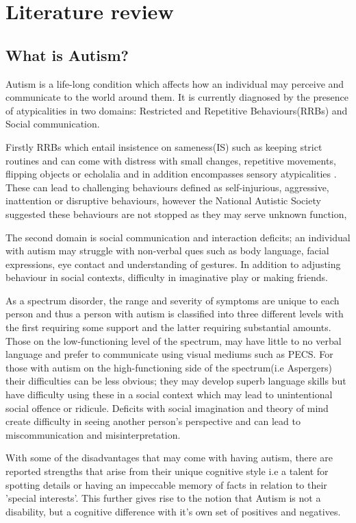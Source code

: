 \documentclass[11pt]{report}
\begin{document}
\chapter{Literature review}

\section{What is Autism?}

Autism is a life-long condition which affects how an individual may perceive and communicate to the world around them\cite{nas}. It is currently diagnosed by the presence of atypicalities in two domains: Restricted and Repetitive Behaviours(RRBs) and Social communication.

Firstly RRBs which entail insistence on sameness(IS) such as keeping strict routines and can come with distress with small changes, repetitive movements, flipping objects or echolalia and in addition encompasses sensory atypicalities \cite{dsm52}. These can lead to challenging behaviours defined as self-injurious, aggressive, inattention or disruptive behaviours\cite{teacherchallenge}, however the National Autistic Society suggested these behaviours are not stopped as they may serve unknown function,
 
The second domain is social communication and interaction deficits; an individual with autism may struggle with non-verbal ques such as body language, facial expressions, eye contact and understanding of gestures. In addition to adjusting behaviour in social contexts, difficulty in imaginative play or making friends.  

As a spectrum disorder, the range and severity of symptoms are unique to each person and thus a person with autism is classified into three different levels with the first requiring some support and the latter requiring substantial amounts\cite{dsm52}. Those on the low-functioning level of the spectrum, may have little to no verbal language and prefer to communicate using visual mediums such as PECS. For those with autism on the high-functioning side of the spectrum(i.e Aspergers) their difficulties can be less obvious; they may develop superb language skills but have difficulty using these in a social context which may lead to unintentional social offence or ridicule. Deficits with social imagination and theory of mind create difficulty in seeing another person's perspective and can lead to miscommunication and misinterpretation. 

With some of the disadvantages that may come with having autism, there are reported strengths that arise from their unique cognitive style i.e a talent for spotting details\cite{bayes} or having an impeccable memory of facts in relation to their 'special interests'. This further gives rise to the notion that Autism is not a disability, but a cognitive difference with it's own set of positives and negatives. 
\end{document}
